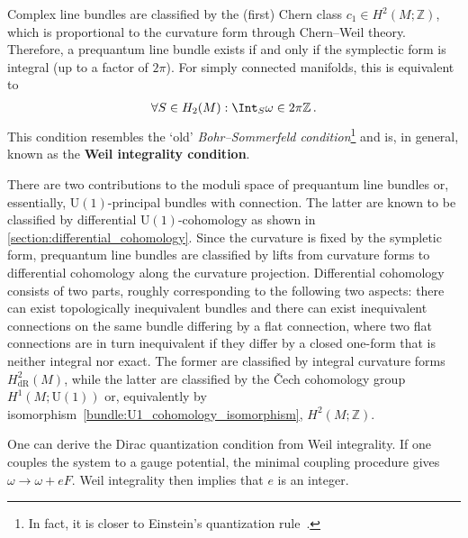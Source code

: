     \begin{property}
        Complex line bundles are classified by the (first) Chern class $c_1\in H^2(M;\mathbb{Z})$, which is proportional to the curvature form through Chern--Weil theory. Therefore, a prequantum line bundle exists if and only if the symplectic form is integral (up to a factor of $2\pi$). For simply connected manifolds, this is equivalent to
        \begin{gather}
            \forall S\in H_2(M):\Int_S\omega\in 2\pi\mathbb{Z}\,.
        \end{gather}
        This condition resembles the `old' \textit{Bohr--Sommerfeld condition}\footnote{In fact, it is closer to Einstein's quantization rule~\citep{stone_einsteins_2005}.} and is, in general, known as the \textbf{Weil integrality condition}.

        There are two contributions to the moduli space of prequantum line bundles or, essentially, $\mathrm{U}(1)$-principal bundles with connection. The latter are known to be classified by differential $\mathrm{U}(1)$-cohomology as shown in \cref{section:differential_cohomology}. Since the curvature is fixed by the sympletic form, prequantum line bundles are classified by lifts from curvature forms to differential cohomology along the curvature projection. Differential cohomology consists of two parts, roughly corresponding to the following two aspects: there can exist topologically inequivalent bundles and there can exist inequivalent connections on the same bundle differing by a flat connection, where two flat connections are in turn inequivalent if they differ by a closed one-form that is neither integral nor exact. The former are classified by integral curvature forms $H^2_{\text{dR}}(M)$, while the latter are classified by the \v{C}ech cohomology group $H^1(M;\mathrm{U}(1))$ or, equivalently by isomorphism~\eqref{bundle:U1_cohomology_isomorphism}, $H^2(M;\mathbb{Z})$.
    \end{property}
    \begin{result}
        One can derive the Dirac quantization condition from Weil integrality. If one couples the system to a gauge potential, the minimal coupling procedure gives $\omega\longrightarrow\omega+eF$. Weil integrality then implies that $e$ is an integer.
    \end{result}

